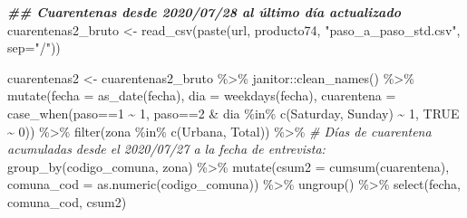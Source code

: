 \documentclass[
  12pt,
]{book}
\newenvironment{Shaded}{\begin{snugshade}}{\end{snugshade}}
\newcommand{\AttributeTok}[1]{\textcolor[rgb]{0.77,0.63,0.00}{#1}}
\newcommand{\CommentTok}[1]{\textcolor[rgb]{0.56,0.35,0.01}{\textit{#1}}}
\newcommand{\ConstantTok}[1]{\textcolor[rgb]{0.00,0.00,0.00}{#1}}
\newcommand{\DecValTok}[1]{\textcolor[rgb]{0.00,0.00,0.81}{#1}}
\newcommand{\DocumentationTok}[1]{\textcolor[rgb]{0.56,0.35,0.01}{\textbf{\textit{#1}}}}
\newcommand{\FunctionTok}[1]{\textcolor[rgb]{0.00,0.00,0.00}{#1}}
\newcommand{\NormalTok}[1]{#1}
\newcommand{\OtherTok}[1]{\textcolor[rgb]{0.56,0.35,0.01}{#1}}
\newcommand{\SpecialCharTok}[1]{\textcolor[rgb]{0.00,0.00,0.00}{#1}}
\newcommand{\StringTok}[1]{\textcolor[rgb]{0.31,0.60,0.02}{#1}}
\begin{document}
\begin{Shaded}
\begin{Highlighting}[]
\DocumentationTok{\#\# Cuarentenas desde 2020/07/28 al último día actualizado}
\NormalTok{cuarentenas2\_bruto }\OtherTok{\textless{}{-}} \FunctionTok{read\_csv}\NormalTok{(}\FunctionTok{paste}\NormalTok{(url, }\StringTok{\textquotesingle{}producto74\textquotesingle{}}\NormalTok{, }\StringTok{"paso\_a\_paso\_std.csv"}\NormalTok{, }\AttributeTok{sep=}\StringTok{"/"}\NormalTok{))}

\NormalTok{cuarentenas2 }\OtherTok{\textless{}{-}}\NormalTok{ cuarentenas2\_bruto }\SpecialCharTok{\%\textgreater{}\%} 
\NormalTok{  janitor}\SpecialCharTok{::}\FunctionTok{clean\_names}\NormalTok{() }\SpecialCharTok{\%\textgreater{}\%} 
  \FunctionTok{mutate}\NormalTok{(}\AttributeTok{fecha =} \FunctionTok{as\_date}\NormalTok{(fecha),}
         \AttributeTok{dia =} \FunctionTok{weekdays}\NormalTok{(fecha),}
         \AttributeTok{cuarentena =} \FunctionTok{case\_when}\NormalTok{(paso}\SpecialCharTok{==}\DecValTok{1} \SpecialCharTok{\textasciitilde{}} \DecValTok{1}\NormalTok{,}
\NormalTok{                                paso}\SpecialCharTok{==}\DecValTok{2} \SpecialCharTok{\&}\NormalTok{ dia }\SpecialCharTok{\%in\%} \FunctionTok{c}\NormalTok{(}\StringTok{\textquotesingle{}Saturday\textquotesingle{}}\NormalTok{, }\StringTok{\textquotesingle{}Sunday\textquotesingle{}}\NormalTok{) }\SpecialCharTok{\textasciitilde{}} \DecValTok{1}\NormalTok{,}
                                \ConstantTok{TRUE} \SpecialCharTok{\textasciitilde{}} \DecValTok{0}\NormalTok{)) }\SpecialCharTok{\%\textgreater{}\%} 
  \FunctionTok{filter}\NormalTok{(zona }\SpecialCharTok{\%in\%} \FunctionTok{c}\NormalTok{(}\StringTok{\textquotesingle{}Urbana\textquotesingle{}}\NormalTok{, }\StringTok{\textquotesingle{}Total\textquotesingle{}}\NormalTok{)) }\SpecialCharTok{\%\textgreater{}\%} 
  \CommentTok{\# Días de cuarentena acumuladas desde el 2020/07/27 a la fecha de entrevista:}
  \FunctionTok{group\_by}\NormalTok{(codigo\_comuna, zona) }\SpecialCharTok{\%\textgreater{}\%} 
  \FunctionTok{mutate}\NormalTok{(}\AttributeTok{csum2 =} \FunctionTok{cumsum}\NormalTok{(cuarentena),}
         \AttributeTok{comuna\_cod =} \FunctionTok{as.numeric}\NormalTok{(codigo\_comuna)) }\SpecialCharTok{\%\textgreater{}\%} 
  \FunctionTok{ungroup}\NormalTok{() }\SpecialCharTok{\%\textgreater{}\%} 
  \FunctionTok{select}\NormalTok{(fecha, comuna\_cod, csum2)}


\end{Highlighting}
\end{Shaded}
\end{document}
